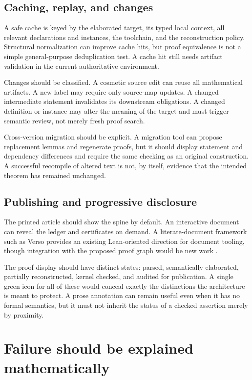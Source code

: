 \documentclass[11pt,a4paper]{article}
\theoremstyle{definition}
\theoremstyle{remark}
\begin{document}
\subsection{Caching, replay, and changes}
A safe cache is keyed by the elaborated target, its typed local context, all relevant declarations and instances, the toolchain, and the reconstruction policy. Structural normalization can improve cache hits, but proof equivalence is not a simple general-purpose deduplication test. A cache hit still needs artifact validation in the current authoritative environment.

Changes should be classified. A cosmetic source edit can reuse all mathematical artifacts. A new label may require only source-map updates. A changed intermediate statement invalidates its downstream obligations. A changed definition or instance may alter the meaning of the target and must trigger semantic review, not merely fresh proof search.

Cross-version migration should be explicit. A migration tool can propose replacement lemmas and regenerate proofs, but it should display statement and dependency differences and require the same checking as an original construction. A successful recompile of altered text is not, by itself, evidence that the intended theorem has remained unchanged.

\subsection{Publishing and progressive disclosure}
The printed article should show the spine by default. An interactive document can reveal the ledger and certificates on demand. A literate-document framework such as Verso provides an existing Lean-oriented direction for document tooling, though integration with the proposed proof graph would be new work \cite{verso}.

The proof display should have distinct states: parsed, semantically elaborated, partially reconstructed, kernel checked, and audited for publication. A single green icon for all of these would conceal exactly the distinctions the architecture is meant to protect. A prose annotation can remain useful even when it has no formal semantics, but it must not inherit the status of a checked assertion merely by proximity.

\section{Failure should be explained mathematically}
\label{sec:diagnostics}
\end{document}
